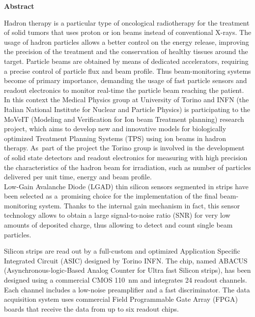 	{\Huge \textbf{Abstract}}
\vspace{2cm}


Hadron therapy is a particular type of oncological radiotherapy for the treatment of solid tumors that uses proton or
ion beams instead of conventional X-rays. The usage of hadron particles allows a better control on the energy release,
improving the precision of the treatment and the conservation of healthy tissues around the target.
Particle beams are obtained by means of dedicated accelerators, requiring a precise control of particle flux and beam profile.
Thus beam-monitoring systems become of primary importance, demanding the usage of fast particle sensors and readout electronics to monitor
real-time the particle beam reaching the patient.\\

In this context the Medical Physics group at University of Torino and INFN (the Italian National Institute for
Nuclear and Particle Physics) is participating to
the MoVeIT (Modeling and Verification for Ion beam Treatment planning) research project, which aims to develop new and
innovative models for biologically optimized Treatment Planning Systems (TPS) using ion beams in hadron therapy.
As~part of the project the Torino group is involved in the development of solid state detectors and readout electronics for measuring with high precision
the characteristics of the hadron beam for irradiation, such as number of particles delivered per unit time, energy and beam profile.\\

Low-Gain Avalanche Diode (LGAD) thin silicon sensors segmented in strips have been selected as a~promising choice for the implementation
of the final beam-monitoring system. Thanks to the internal gain mechanism in fact, this sensor technology allows to obtain a large
signal-to-noise ratio (SNR) for very low amounts of deposited charge, thus allowing to detect and count single beam particles.

\noindent Silicon strips are read out by a full-custom and optimized Application Specific Integrated Circuit (ASIC) designed by Torino INFN.
The chip, named ABACUS (Asynchronous-logic-Based Analog Counter for Ultra fast Silicon strips), has been 
designed using a commercial CMOS 110~nm and integrates 24 readout channels. Each channel includes a low-noise preamplifier 
and a fast discriminator. The data acquisition system uses commercial Field Programmable Gate Array (FPGA) boards that receive
the data from up to six readout chips.\\

